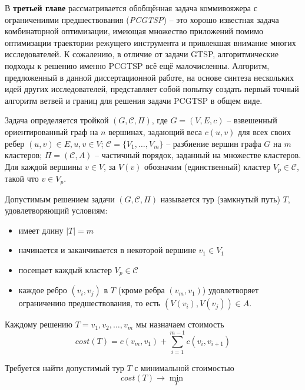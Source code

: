 
В {\bf третьей главе} 
рассматривается обобщённая задача коммивояжера с
ограничениями предшествования ({\it PCGTSP}) --
это хорошо известная задача комбинаторной оптимизации,
имеющая множество приложений помимо
оптимизации траектории режущего инструмента 
и привлекшая внимание многих исследователей.
К сожалению,
в отличие от задачи GTSP,
алгоритмические подходы к решению 
именно PCGTSP всё ещё малочисленны.
Алгоритм, предложенный в данной диссертационной работе,
на основе синтеза нескольких идей других исследователей,
представляет собой попытку
создать первый точный алгоритм 
ветвей и границ для
решения задачи PCGTSP в общем виде.

Задача определяется тройкой
$(G,\mathcal C,\Pi)$, 
где
$G=(V,E,c)$ -- взвешенный ориентированный граф на $n$
вершинах,
задающий веса $c(u,v)$ для всех своих ребер
$(u,v)\in E, u, v \in V$;
$\mathcal C=\{V_1,\ldots,V_m\}$ -- разбиение вершин
графа $G$ на $m$ кластеров;
$ \Pi = (\mathcal C, A) $ -- частичный порядок,
заданный на множестве кластеров.
Для каждой вершины 
$v\in V$, за $V(v)$ 
обозначим (единственный) кластер 
$V_p\in\mathcal C$, 
такой что
$v\in V_p$. 

Допустимым решением задачи
$(G,\mathcal C,\Pi)$
называется тур (замкнутый путь) $T$,
удовлетворяющий условиям:
\begin{itemize}
    \item 
    имеет длину $|T|=m$
    \item
    начинается и заканчивается в некоторой вершине $v_1\in V_1$
    \item 
    посещает каждый кластер $V_p\in\mathcal C$
    \item
	каждое ребро
	$(v_i, v_j)$ в $T$ 
	(кроме ребра $(v_m,v_1)$) 
	удовлетворяет ограничению предшествования,
	то есть
	 $(V(v_i),V(v_j))\in A$.
\end{itemize}

Каждому решению
$T=v_1, v_2, \ldots, v_m$
мы назначаем стоимость
\begin{equation}
    \label{eq:pctgsp-cost}
	cost(T) = c(v_m,v_1) + \sum_{i=1}^{m-1} c(v_i,v_{i+1})
\end{equation}

Требуется найти допустимый тур 
$ T $ 
с минимальной стоимостью
$$ 
cost (T) \to \min_T 
$$

